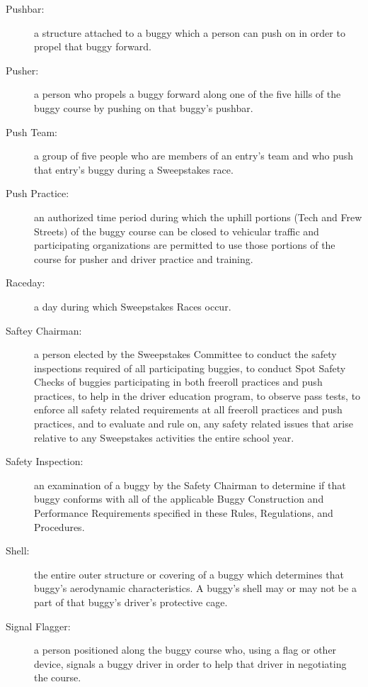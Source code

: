 \begin{description}
	\item[Pushbar:]
	a structure attached to a buggy which a person can push on in order to
	propel that buggy forward.

	\item[Pusher:]
	a person who propels a buggy forward along one of the five hills of the
	buggy course by pushing on that buggy's pushbar.

	\item[Push Team:]
	a group of five people who are members of an entry's team and who push that
	entry's buggy during a Sweepstakes race.

	\item[Push Practice:]
	an authorized time period during which the uphill portions (Tech and Frew
	Streets) of the buggy course can be closed to vehicular traffic and
	participating organizations are permitted to use those portions of the course
	for pusher and driver practice and training.

	\item[Raceday:]
	a day during which Sweepstakes Races occur.

	\item[Saftey Chairman:]
	a person elected by the Sweepstakes Committee to conduct the safety
	inspections required of all participating buggies, to conduct Spot Safety
	Checks of buggies participating in both freeroll practices and push practices,
	to help in the driver education program, to observe pass tests, to enforce all
	safety related requirements at all freeroll practices and push practices, and
	to evaluate and rule on, any safety related issues that arise relative to any
	Sweepstakes activities the entire school year.

	\item[Safety Inspection:]
	an examination of a buggy by the Safety Chairman to determine if that buggy
	conforms with all of the applicable Buggy Construction and Performance
	Requirements specified in these Rules, Regulations, and Procedures.

	\item[Shell:]
	the entire outer structure or covering of a buggy which determines that
	buggy's aerodynamic characteristics. A buggy's shell may or may not be a part
	of that buggy's driver's protective cage.

	\item[Signal Flagger:]
	a person positioned along the buggy course who, using a flag or other
	device, signals a buggy driver in order to help that driver in negotiating the
	course.


\end{description}
